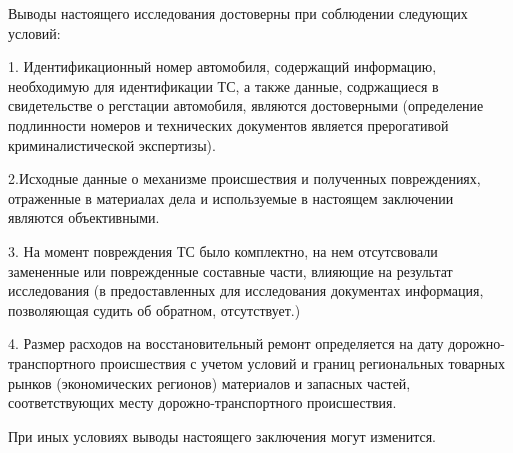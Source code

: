 Выводы настоящего исследования достоверны при соблюдении следующих условий:

1. Идентификационный номер автомобиля, содержащий информацию, необходимую для идентификации ТС, а также данные, содржащиеся в свидетельстве о регстации автомобиля, являются достоверными (определение подлинности номеров и технических документов является прерогативой криминалистической экспертизы).

2.Исходные данные о механизме происшествия и полученных повреждениях, отраженные в материалах дела и используемые в настоящем заключении являются объективными.

3. На момент повреждения ТС было комплектно, на нем отсутсвовали замененные или поврежденные составные части, влияющие на результат исследования (в предоставленных для исследования документах информация, позволяющая судить об обратном, отсутствует.)

4. Размер расходов на восстановительный ремонт определяется на дату
дорожно-транспортного происшествия с учетом условий и границ региональных
товарных рынков (экономических регионов) материалов и запасных частей,
соответствующих месту дорожно-транспортного происшествия.

При иных условиях выводы настоящего заключения могут изменится.